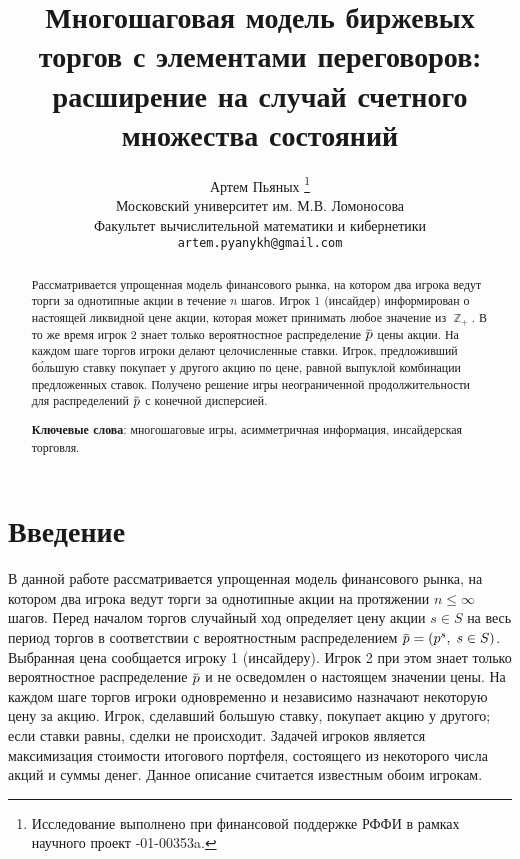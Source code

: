 \documentclass[12pt, draft]{extarticle}
\newcommand{\overbar}[1]%
{\mkern 1.5mu\overline{\mkern-1.3mu#1\mkern-1.3mu}\mkern 1.3mu}
\newcommand{\s}{\ensuremath{s}}
\newcommand{\p}{\ensuremath{\overbar{p}}}
\DeclareMathOperator{\Z}{\mathbb{Z}}
\begin{document}
\title{Многошаговая модель биржевых торгов с элементами переговоров: расширение
  на случай счетного множества состояний%
}%
\author{%
  Артем Пьяных%
  \thanks{%
    Исследование выполнено при финансовой поддержке РФФИ в рамках научного
    проект -01-00353a.%
  }\\
  Московский университет им. М.В. Ломоносова\\
  Факультет вычислительной математики и кибернетики\\
  \texttt{artem.pyanykh@gmail.com}%
}%
\maketitle

\begin{abstract}
  Рассматривается упрощенная модель финансового рынка, на котором два игрока
  ведут торги за однотипные акции в течение $n$ шагов. Игрок 1 (инсайдер)
  информирован о настоящей ликвидной цене акции, которая может принимать любое
  значение из $\Z_+$. В то же время игрок 2 знает только вероятностное
  распределение $\p$ цены акции. На каждом шаге торгов игроки делают
  целочисленные ставки. Игрок, предложивший б\'{о}льшую ставку покупает у
  другого акцию по цене, равной выпуклой комбинации предложенных ставок.
  Получено решение игры неограниченной продолжительности для распределений $\p$
  с конечной дисперсией.

  \textbf{Ключевые слова}: многошаговые игры, асимметричная информация,
  инсайдерская торговля.
\end{abstract}

\section{Введение}
\label{sec:intro}

В данной работе рассматривается упрощенная модель финансового рынка, на котором
два игрока ведут торги за однотипные акции на протяжении $n \leqslant \infty$
шагов. Перед началом торгов случайный ход определяет цену акции $\s \in S$ на
весь период торгов в соответствии с вероятностным распределением $\p = (p^s, \;
s \in S)$. Выбранная цена сообщается игроку 1 (инсайдеру). Игрок 2 при этом
знает только вероятностное распределение $\p$ и не осведомлен о настоящем
значении цены. На каждом шаге торгов игроки одновременно и независимо назначают
некоторую цену за акцию. Игрок, сделавший большую ставку, покупает акцию у
другого; если ставки равны, сделки не происходит. Задачей игроков является
максимизация стоимости итогового портфеля, состоящего из некоторого числа акций
и суммы денег. Данное описание считается известным обоим игрокам.
\end{document}

